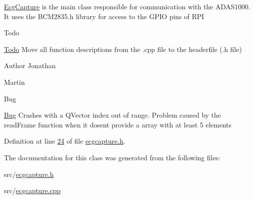 \hyperlink{classEcgCapture}{Ecg\+Capture} is the main class responsible for communication with the A\+D\+A\+S1000. It uses the B\+C\+M2835.\+h library for access to the G\+P\+IO pins of R\+PI

\begin{DoxyRefDesc}{Todo}
\item[\hyperlink{todo__todo000011}{Todo}]Move all function descriptions from the .cpp file to the headerfile (.h file) \begin{DoxyAuthor}{Author}
Jonathan 

Martin 
\end{DoxyAuthor}
\end{DoxyRefDesc}
\begin{DoxyRefDesc}{Bug}
\item[\hyperlink{bug__bug000003}{Bug}]Crashes with a Q\+Vector index out of range. Problem caused by the read\+Frame function when it dosent provide a array with at least 5 elements \end{DoxyRefDesc}


Definition at line \hyperlink{ecgcapture_8h_source_l00024}{24} of file \hyperlink{ecgcapture_8h_source}{ecgcapture.\+h}.



The documentation for this class was generated from the following files\+:\begin{DoxyCompactItemize}
\item 
src/\hyperlink{ecgcapture_8h}{ecgcapture.\+h}\item 
src/\hyperlink{ecgcapture_8cpp}{ecgcapture.\+cpp}\end{DoxyCompactItemize}
